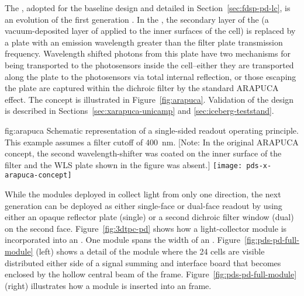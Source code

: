 The , adopted for the baseline design and detailed in 
Section~\ref{sec:fdsp-pd-lc}, is an evolution of the first generation .  In the , the secondary  layer of the  (a vacuum-deposited layer of  applied to the inner surfaces of the cell) is replaced by a  plate with an emission wavelength greater than the filter plate transmission frequency.  Wavelength shifted photons from this plate have two mechanisms for being transported to the photosensors inside the cell--either they are transported along the  plate to the photosensors via total internal reflection, or those escaping the plate are captured within the dichroic filter by the standard ARAPUCA effect.
The concept is illustrated in Figure~\ref{fig:arapuca}.
Validation of the  design is described in Sections~\ref{sec:xarapuca-unicamp} and \ref{sec:iceberg-teststand}.

\begin{dunefigure}{fig:arapuca}
{Schematic representation of a single-sided readout   operating principle.  This example assumes a filter cutoff of \SI{400}{nm}. [Note: In the original ARAPUCA concept, the second wavelength-shifter was coated on the inner surface of the filter and the WLS plate shown in the figure was absent.]}               
\texttt{[image: pds-x-arapuca-concept]}   
\end{dunefigure}

While the  modules deployed in  collect light from only one direction, the next generation  can be deployed as either single-face or dual-face readout by using either an opaque reflector plate (single) or a second dichroic filter window (dual) on the second face. 
Figure~\ref{fig:3dtpc-pd} shows how a light-collector module is incorporated into an . One module spans the width of an . Figure~\ref{fig:pds-pd-full-module} (left) shows a detail of the module where the 24  cells are visible distributed either side of a signal summing and interface board that becomes enclosed by the hollow central beam of the  frame. Figure~\ref{fig:pds-pd-full-module} (right) illustrates how a module is inserted into an  frame.

